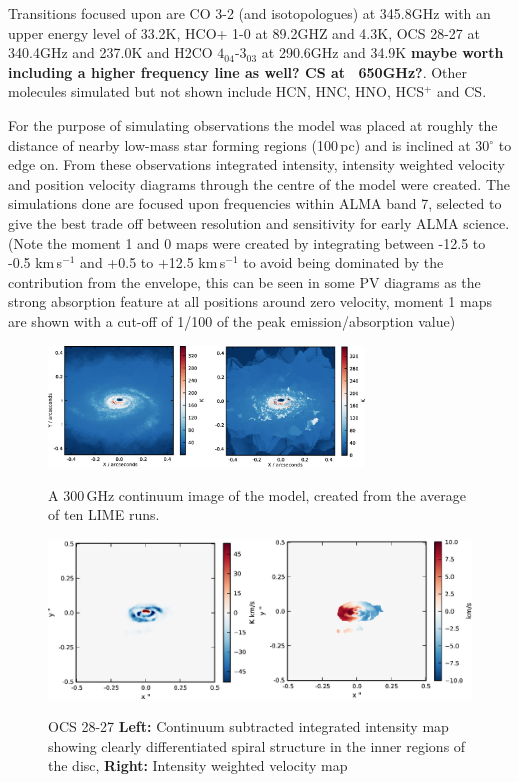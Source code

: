 \documentclass[useAMS,usenatbib]{mn2e}
\begin{document}
Transitions focused upon are CO 3-2 (and isotopologues) at 345.8GHz with an upper energy level of 33.2K, HCO+ 1-0 at 89.2GHZ and 4.3K, OCS 28-27 at 340.4GHz and 237.0K and H2CO $4_{04}$-3$_{03}$ at 290.6GHz and 34.9K {\bf maybe worth including a higher frequency line as well? CS at ~650GHz?}. Other molecules simulated but not shown include HCN, HNC, HNO, HCS$^+$ and CS.\newline

For the purpose of simulating observations the model was placed at roughly the distance of nearby low-mass star forming regions (100$\,$pc) and is inclined at 30$^\circ$ to edge on. From these observations integrated intensity, intensity weighted velocity and position velocity diagrams through the centre of the model were created.
The simulations done are focused upon frequencies within ALMA band 7, selected to give the best trade off between resolution and sensitivity for early ALMA science.
(Note the moment 1 and 0 maps were created by integrating between -12.5 to -0.5 km$\,$s$^{-1}$ and +0.5 to +12.5 km$\,$s$^{-1}$ to avoid being dominated by the contribution from the envelope, this can be seen in some PV diagrams as the strong absorption feature at all positions around zero velocity, moment 1 maps are shown with a cut-off of 1/100 of the peak emission/absorption value)\newline

\begin{figure}
 \includegraphics[width=84mm]{Figures/sim/continuum.eps}
 \label{points}
 \caption{A 300$\,$GHz continuum image of the model, created from the average of ten LIME runs.}
\end{figure}

\begin{figure}
 \includegraphics[width=168mm]{Figures/sim/imageOCS_28-27_30deg_composite_all.eps}
 \label{OCS_all}
 \caption{OCS 28-27 {\bf Left:} Continuum subtracted integrated intensity map showing clearly differentiated spiral structure in the inner regions of the disc, {\bf Right:} Intensity weighted velocity map}
\end{figure}
\end{document}
